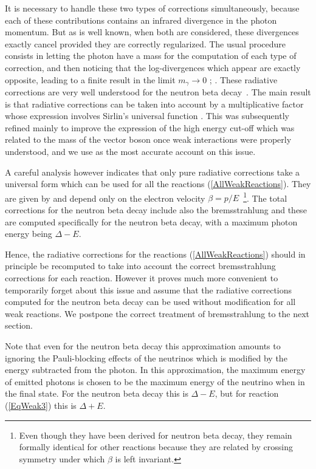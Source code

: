 \documentclass[onecolumn,float,floatfix,preprintnumbers,aps,rmp,nofootinbib,amsmath,amssymb,amsfonts,superscriptaddress,tightenlines]{revtex4}
\newcommand{\Gap}{\Delta}
\begin{document}
It is necessary to handle these two types of corrections simultaneously, because
each of these contributions contains an infrared divergence in the photon momentum. But as is
well known, when both are considered, these divergences exactly cancel
provided they are correctly regularized. The usual procedure consists
in letting the photon have a mass for the computation of each type of
correction, and then noticing that the log-divergences which appear are exactly
opposite, leading to a finite result in the limit $m_\gamma \to 0$ \citep{Dicus1968}; \citep[App. B]{Ivanov:2012qe}. These radiative corrections are very well understood for the
neutron beta decay~\cite{Sirlin1967,Dicus1968,Czarnecki2004,Marciano:2005ec}. The main result
is that radiative corrections can be taken into
account by a multiplicative factor whose expression involves Sirlin's
universal function \citep[Eq. 20b]{Sirlin1967}. This was
subsequently refined mainly to improve the
expression of the high energy cut-off which was  related to the mass of
the vector boson once weak interactions were properly understood, and
we use \citet{Czarnecki2004} as the most accurate account on this issue.

A careful analysis however indicates that only pure radiative
corrections take a universal form which can be used for all the reactions
(\ref{AllWeakReactions}). They are given by \citet[Eq. 6.2]{Dicus1968}
and depend only on the electron velocity $\beta = p/E$~\footnote{Even
  though they have been derived for neutron beta decay, they remain
  formally identical for other reactions because they are related by
  crossing symmetry under which $\beta$ is left invariant.}. The total
corrections for the neutron beta decay include also the bremsstrahlung
\citep[Eq. 6.6]{Dicus1968} and these are computed specifically for the neutron beta decay, with a
maximum photon energy being $\Gap-E$. 

Hence, the radiative corrections for the reactions
(\ref{AllWeakReactions}) should in principle be recomputed
to take into account the correct bremsstrahlung corrections for each
reaction. However it proves much more convenient to temporarily forget
about this issue and assume that the radiative corrections computed
for the neutron beta decay can be used without modification for all
weak reactions.  We postpone the correct treatment of bremsstrahlung
to the next section. 

Note that even for the neutron beta decay this approximation amounts to ignoring the
Pauli-blocking effects of the neutrinos which is modified by the
energy subtracted from the photon. In this approximation, the maximum energy of emitted
photons is chosen to be the maximum energy of the neutrino when in the
final state. For the neutron beta decay this is $\Gap-E$, but for
reaction (\ref{EqWeak3}) this is $\Gap+E$.
\end{document}

